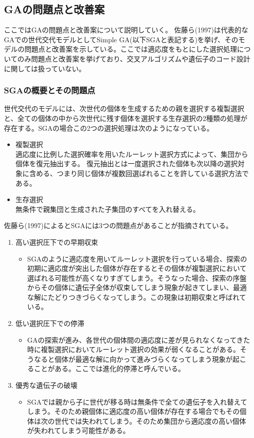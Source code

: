 
\subsection{GAの問題点と改善案}
ここではGAの問題点と改善案について説明していく。
佐藤ら(1997)は代表的なGAでの世代交代モデルとしてSimple GA(以下SGAと表記する)を挙げ、そのモデルの問題点と改善案を示している。ここでは適応度をもとにした選択処理についてのみ問題点と改善案を挙げており、交叉アルゴリズムや遺伝子のコード設計に関しては扱っていない。

\subsubsection{SGAの概要とその問題点}
世代交代のモデルには、次世代の個体を生成するための親を選択する複製選択と、全ての個体の中から次世代に残す個体を選択する生存選択の2種類の処理が存在する。SGAの場合この2つの選択処理は次のようになっている。

\begin{itemize}
\item{複製選択}\\
適応度に比例した選択確率を用いたルーレット選択方式によって、集団から個体を復元抽出する。
復元抽出とは一度選択された個体も次以降の選択対象に含める、つまり同じ個体が複数回選ばれることを許している選択方法である。
\item{生存選択}\\
無条件で親集団と生成された子集団のすべてを入れ替える。
\end{itemize}

佐藤ら(1997)によるとSGAには3つの問題点があることが指摘されている。
\begin{enumerate}
\item{高い選択圧下での早期収束}
\begin{itemize}
\item{SGAのように適応度を用いてルーレット選択を行っている場合、探索の初期に適応度が突出した個体が存在するとその個体が複製選択において選ばれる可能性が高くなりすぎてしまう。そうなった場合、探索の序盤からその個体に遺伝子全体が収束してしまう現象が起きてしまい、最適な解にたどりつきづらくなってしまう。この現象は初期収束と呼ばれている。}
\end{itemize}
\item{低い選択圧下での停滞}
\begin{itemize}
\item{GAの探索が進み、各世代の個体間の適応度に差が見られなくなってきた時に複製選択においてルーレット選択の効果が弱くなることがある。そうなると個体が最適な解に向かって進みづらくなってしまう現象が起こることがある。ここでは進化的停滞と呼んでいる。}
\end{itemize}
\item{優秀な遺伝子の破壊}
\begin{itemize}
\item{SGAでは親から子に世代が移る時は無条件で全ての遺伝子を入れ替えてしまう。そのため親個体に適応度の高い個体が存在する場合でもその個体は次の世代では失われてしまう。そのため集団から適応度の高い個体が失われてしまう可能性がある。}
\end{itemize}
\end{enumerate}



